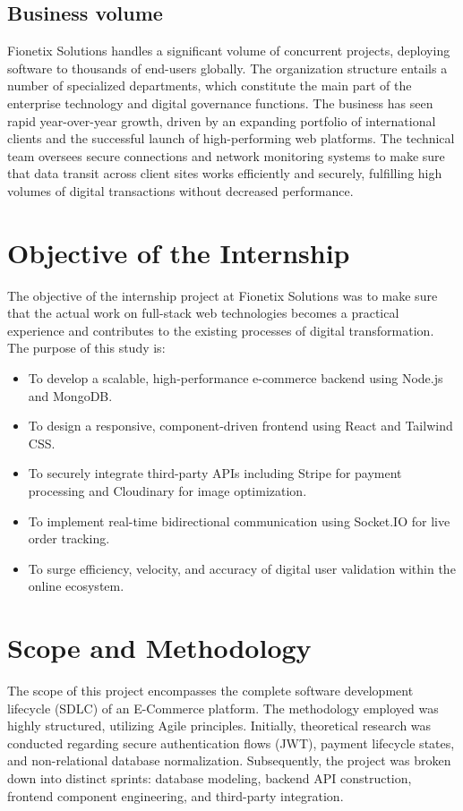 \documentclass[12pt,a4paper]{report}
\begin{document}
\subsection{Business volume}
Fionetix Solutions handles a significant volume of concurrent projects, deploying software to thousands of end-users globally. The organization structure entails a number of specialized departments, which constitute the main part of the enterprise technology and digital governance functions. The business has seen rapid year-over-year growth, driven by an expanding portfolio of international clients and the successful launch of high-performing web platforms. The technical team oversees secure connections and network monitoring systems to make sure that data transit across client sites works efficiently and securely, fulfilling high volumes of digital transactions without decreased performance.

\section{Objective of the Internship}
The objective of the internship project at Fionetix Solutions was to make sure that the actual work on full-stack web technologies becomes a practical experience and contributes to the existing processes of digital transformation. The purpose of this study is:
\begin{itemize}
    \item To develop a scalable, high-performance e-commerce backend using Node.js and MongoDB.
    \item To design a responsive, component-driven frontend using React and Tailwind CSS.
    \item To securely integrate third-party APIs including Stripe for payment processing and Cloudinary for image optimization.
    \item To implement real-time bidirectional communication using Socket.IO for live order tracking.
    \item To surge efficiency, velocity, and accuracy of digital user validation within the online ecosystem.
\end{itemize}

\section{Scope and Methodology}
The scope of this project encompasses the complete software development lifecycle (SDLC) of an E-Commerce platform. The methodology employed was highly structured, utilizing Agile principles. Initially, theoretical research was conducted regarding secure authentication flows (JWT), payment lifecycle states, and non-relational database normalization. Subsequently, the project was broken down into distinct sprints: database modeling, backend API construction, frontend component engineering, and third-party integration.
\end{document}
